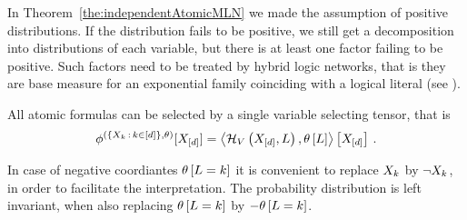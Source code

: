 
In Theorem~\ref{the:independentAtomicMLN} we made the assumption of positive distributions.
If the distribution fails to be positive, we still get a decomposition into distributions of each variable, but there is at least one factor failing to be positive.
Such factors need to be treated by hybrid logic networks, that is they are base measure for an exponential family coinciding with a logical literal (see ).

All atomic formulas can be selected by a single variable selecting tensor, that is
\[ \phi^{(\{X_{k} \, : \, k\in[d]\},\theta)}[X_{[d]}]
= \left\langle \mathcal{H}_{V}\left(X_{[d]},L\right),\theta\left[L\right]\right\rangle \left[ X_{[d]} \right] \, .
\]

In case of negative coordiantes $\theta\left[L=k\right]$ it is convenient to replace $X_{k}$ by $\lnot X_{k}$, in order to facilitate the interpretation.
The probability distribution is left invariant, when also replacing $\theta\left[L=k\right]$ by $-\theta\left[L=k\right]$.




